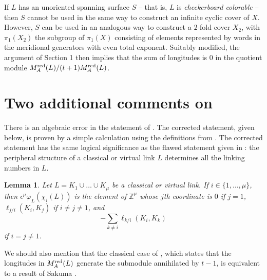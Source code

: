 \documentclass[11pt]{article}
\numberwithin{equation}{section}
\newtheorem{lemma}[theorem]{Lemma}
\theoremstyle{definition}
\newcommand{\Mr}{M_A^{\textup{red}}}
\begin{document}
If $L$ has an unoriented spanning surface $S$ -- that is, $L$ is {\sl checkerboard colorable} -- then $S$ cannot be used in the same way to construct an infinite cyclic cover of $X$. However, $S$ can be used in an analogous way to construct a $2$-fold cover $X_2$, with $\pi_1(X_2)$ the subgroup of $\pi_1(X)$  consisting of elements represented by words in the meridional generators with even total exponent. Suitably modified, the argument of Section 1 then implies that the sum of longitudes is $0$ in the quotient module $\Mr(L)/(t+1)\Mr(L)$. 

\section{Two additional comments on \cite{T}}

There is an algebraic error in the statement of \cite[Lemma 8]{T}. The corrected statement, given below, is proven by a simple calculation using the definitions from \cite{T}.  The corrected statement has the same logical significance as the flawed statement given in \cite[Lemma 8]{T}: the peripheral structure of a classical or virtual link $L$ determines all the linking numbers in $L$. 
\begin{lemma}
\label{linklem}
Let $L=K_1 \cup \dots \cup K_{\mu}$ be a classical or virtual link. If $i \in \{1, \dots, \mu\}$, then $\epsilon^\mu \varphi_L (\chi_i(L))$ is the element of $\mathbb Z ^ \mu$ whose $j$th coordinate is $0$ if $j=1$, $\ell_{j/i}(K_i,K_j)$ if $i \neq j \neq 1$, and 
\[
-\sum _{k \neq i} \ell_{k/i}(K_i,K_k)
\]
if $i=j \neq 1$.
\end{lemma}

We should also mention that the classical case of \cite[Theorem 9]{T}, which states that the longitudes in $\Mr(L)$ generate the submodule annihilated by $t-1$, is equivalent to a result of Sakuma \cite[Theorem 4]{S}.
\end{document}
